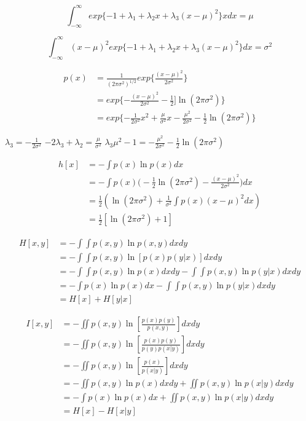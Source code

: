 $$
\int_{-\infty}^\infty  exp\{-1+\lambda_1 + \lambda_2x + \lambda_3(x-\mu)^2\} xdx = \mu
$$

$$
\int_{-\infty}^\infty (x - \mu)^2 exp\{-1+\lambda_1 + \lambda_2x + \lambda_3(x-\mu)^2\}dx = \sigma^2
$$

$$
\begin{aligned}
  p(x) &= \frac{1}{(2\pi \sigma^2)^{1/2}}exp\{\frac{(x-\mu)^2}{2\sigma ^2}\}\\
& = exp\{-\frac{(x-\mu)^2}{2\sigma^2} - \frac{1}{2}]\ln (2\pi \sigma^2)\}\\
& = exp\{-\frac{1}{2\sigma^2}x^2 + \frac{\mu}{\sigma^2}x - \frac{\mu ^ 2}{2\sigma^2} - \frac{1}{2}\ln (2\pi \sigma^2)\}
\end{aligned}
$$

$\lambda_3 = -\frac{1}{2\sigma^2}$
$-2\lambda_3 + \lambda_2 = \frac{\mu}{\sigma^2}$
$\lambda_3 \mu^2 - 1 = -\frac{\mu^2}{2\sigma^2}-\frac{1}{2}\ln (2\pi \sigma^2)$

$$
\begin{aligned}
  h[x] &= -\int p(x)\ln p(x)dx\\
& = -\int p(x)\Big(-\frac{1}{2}\ln (2\pi \sigma^2) - \frac{(x-\mu)^2}{2\sigma^2}\Big)dx\\
& = \frac{1}{2}(\ln(2\pi \sigma^2) + \frac{1}{\sigma ^2}\int p(x)(x-\mu)^2dx)\\
& = \frac{1}{2}[\ln (2\pi \sigma^2) + 1]
\end{aligned}
$$

$$
\begin{aligned}
  H[x,y] &= -\int \int p(x,y)\ln p(x,y)dxdy\\
  & = -\int \int p(x,y)\ln [p(x)p(y|x)]dxdy\\
  & = -\int \int p(x,y)\ln p(x)dxdy - \int \int p(x,y)\ln p(y|x)dxdy\\
  & = -\int p(x)\ln p(x)dx - \int \int p(x,y)\ln p(y|x)dxdy\\
  & = H[x] + H[y|x]
\end{aligned}
$$

$$
\begin{aligned}
  I[x,y] &= -\iint p(x,y)\ln [\frac{p(x)p(y)}{p(x,y)}]dxdy\\
  & = -\iint p(x,y)\ln [\frac{p(x)p(y)}{p(y)p(x|y)}]dxdy\\
  & = -\iint p(x,y) \ln [\frac{p(x)}{p(x|y)}]dxdy\\
  & = -\iint p(x,y)\ln p(x)dxdy + \iint p(x,y)\ln p(x|y)dxdy\\
  & = -\int p(x)\ln p(x)dx + \iint p(x,y)\ln p(x|y)dxdy\\
  & = H[x] - H[x|y]
\end{aligned}
$$
